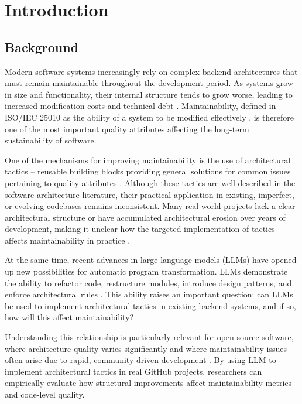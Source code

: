 \chapter{Introduction}
\label{chap:intro}
\section{Background}
\label{sec:section}

Modern software systems increasingly rely on complex backend architectures that must remain maintainable throughout the development period. As systems grow in size and functionality, their internal structure tends to grow worse, leading to increased modification costs and technical debt \cite{molnar2020study}. Maintainability, defined in ISO/IEC 25010 as the ability of a system to be modified effectively \cite{ISO25010}, is therefore one of the most important quality attributes affecting the long-term sustainability of software.

One of the mechanisms for improving maintainability is the use of architectural tactics -- reusable building blocks providing general solutions for common issues pertaining to quality attributes \cite{kim2009qualitydriven}. Although these tactics are well described in the software architecture literature, their practical application in existing, imperfect, or evolving codebases remains inconsistent. Many real-world projects lack a clear architectural structure or have accumulated architectural erosion over years of development, making it unclear how the targeted implementation of tactics affects maintainability in practice \cite{kassab2018software, perry1992foundations}.

At the same time, recent advances in large language models (LLMs) have opened up new possibilities for automatic program transformation. LLMs demonstrate the ability to refactor code, restructure modules, introduce design patterns, and enforce architectural rules \cite{depalma2024exploring}. This ability raises an important question: can LLMs be used to implement architectural tactics in existing backend systems, and if so, how will this affect maintainability?

Understanding this relationship is particularly relevant for open source software, where architecture quality varies significantly and where maintainability issues often arise due to rapid, community-driven development \cite{kassab2018software}. By using LLM to implement architectural tactics in real GitHub projects, researchers can empirically evaluate how structural improvements affect maintainability metrics and code-level quality.

